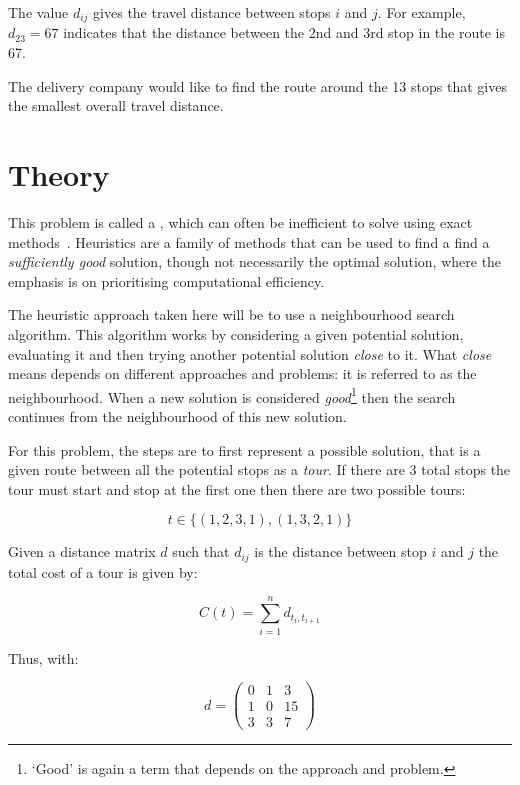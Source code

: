 \tiny{
    
}
\normalsize

The value \(d_{ij}\) gives the travel distance between
stops \(i\) and \(j\). For example, \(d_{23}=67\)
indicates that the distance between the 2nd and 3rd stop in the route is 67.


The delivery company would like to find the route around the 13 stops that gives
the smallest overall travel distance.


\section{Theory}\label{sec:heuristics_theory}

This problem is called a , which can
often be inefficient to solve using exact
methods~\cite{michalewicz2013solve}.
Heuristics are a family of methods that can be used to find a find a
\emph{sufficiently good} solution, though not necessarily the optimal solution,
where the emphasis is on prioritising computational efficiency.

The heuristic approach taken here will be to use a neighbourhood search algorithm.
This algorithm works by considering a given potential solution, evaluating it
and then trying another potential solution \emph{close} to it. What \emph{close}
means depends on different approaches and problems: it is referred to as the
neighbourhood. When a new solution is considered \emph{good}\footnote{`Good' is
again a term that depends on the approach and problem.} then the search
continues from the neighbourhood of this new solution.

For this problem, the steps are to first represent a possible solution, that is a given route
between all the potential stops as a \emph{tour}. If there are 3 total stops
the tour must start and stop at the first one then there are two
possible tours:

\[
    t \in \{(1, 2, 3, 1), (1, 3, 2, 1)\}
\]

Given a distance matrix \(d\) such that \(d_{ij}\) is the distance between stop
\(i\) and \(j\) the total cost of a tour is given by:

\[
    C(t)=\sum_{i=1}^{n} d_{t_i, t_{i + 1}}
\]

Thus, with:

\[
    d = \begin{pmatrix}
        0 & 1 & 3\\
        1 & 0 & 15\\
        3 & 3 & 7
        \end{pmatrix}
\]

